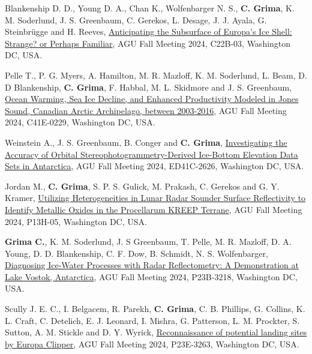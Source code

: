 \begin{etaremune}
\item
    Blankenship D. D., Young D. A., Chan K., Wolfenbarger N. S., \textbf{C. Grima}, K. M. Soderlund, J. S. Greenbaum, C. Gerekos, L. Desage, J. J. Ayala, G. Steinbrügge and H. Reeves, \href{https://agu.confex.com/agu/agu24/meetingapp.cgi/Paper/1727443}{Anticipating the Subsurface of Europa’s Ice Shell: Strange? or Perhaps Familiar}, AGU Fall Meeting 2024, C22B-03, Washington DC, USA.
    
\item
    Pelle T., P. G. Myers, A. Hamilton, M. R. Mazloff, K. M. Soderlund, L. Beam, D. D Blankenship, \textbf{C. Grima}, F. Habbal, M. L. Skidmore and J. S. Greenbaum, \href{https://agu.confex.com/agu/agu24/meetingapp.cgi/Paper/1704194}{Ocean Warming, Sea Ice Decline, and Enhanced Productivity Modeled in Jones Sound, Canadian Arctic Archipelago, between 2003-2016}, AGU Fall Meeting 2024, C41E-0229, Washington DC, USA.
    
\item
    Weinstein A., J. S. Greenbaum, B. Conger and \textbf{C. Grima}, \href{https://agu.confex.com/agu/agu24/meetingapp.cgi/Paper/1573661}{Investigating the Accuracy of Orbital Stereophotogrammetry-Derived Ice-Bottom Elevation Data Sets in Antarctica}, AGU Fall Meeting 2024, ED41C-2626, Washington DC, USA.
    
\item
    Jordan M., \textbf{C. Grima}, S. P. S. Gulick, M. Prakash, C. Gerekos and G. Y. Kramer, \href{https://agu.confex.com/agu/agu24/meetingapp.cgi/Paper/1658169}{Utilizing Heterogeneities in Lunar Radar Sounder Surface Reflectivity to Identify Metallic Oxides in the Procellarum KREEP Terrane}, AGU Fall Meeting 2024, P13H-05, Washington DC, USA.
    
\item
    \textbf{Grima C.}, K. M. Soderlund, J. S Greenbaum, T. Pelle, M. R. Mazloff, D. A. Young, D. D. Blankenship, C. F. Dow, B. Schmidt, N. S. Wolfenbarger, \href{https://agu.confex.com/agu/agu24/meetingapp.cgi/Paper/1567915}{Diagnosing Ice-Water Processes with Radar Reflectometry: A Demonstration at Lake Vostok, Antarctica}, AGU Fall Meeting 2024, P23B-3218, Washington DC, USA.
    
\item
    Scully J. E. C., I. Belgacem, R. Parekh, \textbf{C. Grima}, C. B. Phillips, G. Collins, K. L. Craft, C. Detelich, E. J. Leonard, I. Mishra, G. Patterson, L. M. Prockter, S. Sutton, A. M. Stickle and D. Y. Wyrick, \href{https://agu.confex.com/agu/agu24/meetingapp.cgi/Paper/1641784}{Reconnaissance of potential landing sites by Europa Clipper}, AGU Fall Meeting 2024, P23E-3263, Washington DC, USA.
    

\end{etaremune}
